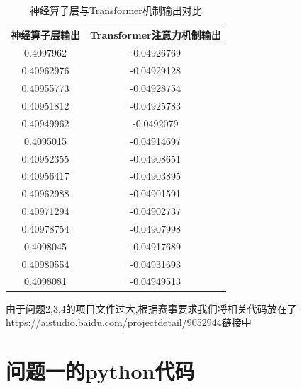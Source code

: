 \documentclass{MMCStyle}
\begin{document}
\begin{table}[H]
\centering
\caption{神经算子层与Transformer机制输出对比\label{tab6}}
\begin{tabular}{cc}  
\toprule
\textbf{神经算子层输出} & \textbf{Transformer注意力机制输出} \\ 
\midrule
0.4097962 & -0.04926769 \\
0.40962976 & -0.04929128 \\
0.40955773 & -0.04928754 \\
0.40951812 & -0.04925783 \\
0.40949962 & -0.0492079 \\
0.4095015 & -0.04914697 \\
0.40952355 & -0.04908651 \\
0.40956417 & -0.04903895 \\
0.40962988 & -0.04901591 \\
0.40971294 & -0.04902737 \\
0.40978754 & -0.04907998 \\
0.4098045 & -0.04917689 \\
0.40980554 & -0.04931693 \\
0.4098081 & -0.04949513 \\
\bottomrule
\end{tabular}  
\end{table}

由于问题2,3,4的项目文件过大,根据赛事要求我们将相关代码放在了\url{https://aistudio.baidu.com/projectdetail/9052944}链接中

\section{问题一的python代码}
\end{document}

